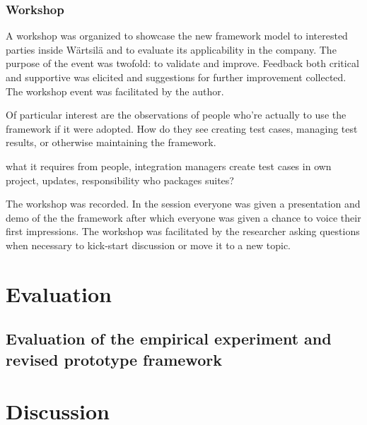 \documentclass[12pt,a4paper,oneside,pdftex]{report}
\begin{document}
{\subsection{Workshop}

A workshop was organized to showcase the new framework model to interested parties inside Wärtsilä and to evaluate its applicability in the company. The purpose of the event was twofold: to validate and improve. Feedback both critical and supportive was elicited and suggestions for further improvement collected. The workshop event was facilitated by the author.

Of particular interest are the observations of people who're actually to use the framework if it were adopted. How do they see creating test cases, managing test results, or otherwise maintaining the framework. 

what it requires from people, integration managers create test cases in own project, updates, responsibility
who packages suites?

The workshop was recorded. In the session everyone was given a presentation and demo of the the framework after which everyone was given a chance to voice their first impressions. The workshop was facilitated by the researcher asking questions when necessary to kick-start discussion or move it to a new topic.




\chapter{Evaluation}
\label{chapter:evaluation}

\section{Evaluation of the empirical experiment and revised prototype framework}

\chapter{Discussion}
\label{chapter:discussion}

}
\end{document}
